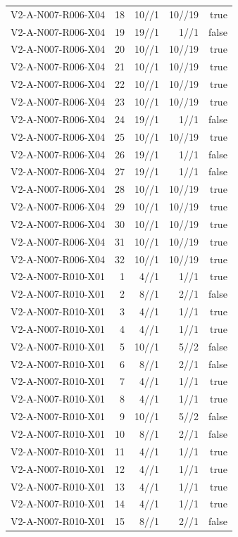 {\begin{longtable}{lrrrr}
V2-A-N007-R006-X04 & 18 & 10//1 & 10//19 & true \\
V2-A-N007-R006-X04 & 19 & 19//1 & 1//1 & false \\
V2-A-N007-R006-X04 & 20 & 10//1 & 10//19 & true \\
V2-A-N007-R006-X04 & 21 & 10//1 & 10//19 & true \\
V2-A-N007-R006-X04 & 22 & 10//1 & 10//19 & true \\
V2-A-N007-R006-X04 & 23 & 10//1 & 10//19 & true \\
V2-A-N007-R006-X04 & 24 & 19//1 & 1//1 & false \\
V2-A-N007-R006-X04 & 25 & 10//1 & 10//19 & true \\
V2-A-N007-R006-X04 & 26 & 19//1 & 1//1 & false \\
V2-A-N007-R006-X04 & 27 & 19//1 & 1//1 & false \\
V2-A-N007-R006-X04 & 28 & 10//1 & 10//19 & true \\
V2-A-N007-R006-X04 & 29 & 10//1 & 10//19 & true \\
V2-A-N007-R006-X04 & 30 & 10//1 & 10//19 & true \\
V2-A-N007-R006-X04 & 31 & 10//1 & 10//19 & true \\
V2-A-N007-R006-X04 & 32 & 10//1 & 10//19 & true \\
V2-A-N007-R010-X01 & 1 & 4//1 & 1//1 & true \\
V2-A-N007-R010-X01 & 2 & 8//1 & 2//1 & false \\
V2-A-N007-R010-X01 & 3 & 4//1 & 1//1 & true \\
V2-A-N007-R010-X01 & 4 & 4//1 & 1//1 & true \\
V2-A-N007-R010-X01 & 5 & 10//1 & 5//2 & false \\
V2-A-N007-R010-X01 & 6 & 8//1 & 2//1 & false \\
V2-A-N007-R010-X01 & 7 & 4//1 & 1//1 & true \\
V2-A-N007-R010-X01 & 8 & 4//1 & 1//1 & true \\
V2-A-N007-R010-X01 & 9 & 10//1 & 5//2 & false \\
V2-A-N007-R010-X01 & 10 & 8//1 & 2//1 & false \\
V2-A-N007-R010-X01 & 11 & 4//1 & 1//1 & true \\
V2-A-N007-R010-X01 & 12 & 4//1 & 1//1 & true \\
V2-A-N007-R010-X01 & 13 & 4//1 & 1//1 & true \\
V2-A-N007-R010-X01 & 14 & 4//1 & 1//1 & true \\
V2-A-N007-R010-X01 & 15 & 8//1 & 2//1 & false \\

\end{longtable}}
